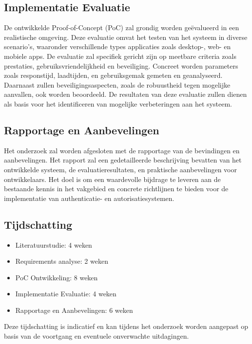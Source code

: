 \subsection{Implementatie Evaluatie}

De ontwikkelde Proof-of-Concept (PoC) zal grondig worden geëvalueerd in een realistische omgeving. Deze evaluatie omvat het testen van het systeem in 
diverse scenario's, waaronder verschillende types applicaties zoals desktop-, web- en mobiele apps. De evaluatie zal specifiek gericht zijn op meetbare 
criteria zoals prestaties, gebruiksvriendelijkheid en beveiliging. Concreet worden parameters zoals responstijd, laadtijden, en gebruiksgemak gemeten en 
geanalyseerd. Daarnaast zullen beveiligingsaspecten, zoals de robuustheid tegen mogelijke aanvallen, ook worden beoordeeld. De resultaten van deze 
evaluatie zullen dienen als basis voor het identificeren van mogelijke verbeteringen aan het systeem.

\subsection{Rapportage en Aanbevelingen}

Het onderzoek zal worden afgesloten met de rapportage van de bevindingen en aanbevelingen. Het rapport zal een gedetailleerde beschrijving bevatten 
van het ontwikkelde systeem, de evaluatieresultaten, en praktische aanbevelingen voor ontwikkelaars. Het doel is om een waardevolle bijdrage te leveren 
aan de bestaande kennis in het vakgebied en concrete richtlijnen te bieden voor de implementatie van authenticatie- en autorisatiesystemen.

\subsection{Tijdschatting}

\begin{itemize}
\item Literatuurstudie: 4 weken
\item Requirements analyse: 2 weken
\item PoC Ontwikkeling: 8 weken
\item Implementatie Evaluatie: 4 weken
\item Rapportage en Aanbevelingen: 6 weken
\end{itemize}

Deze tijdschatting is indicatief en kan tijdens het onderzoek worden aangepast op basis van de voortgang en eventuele onverwachte uitdagingen.

